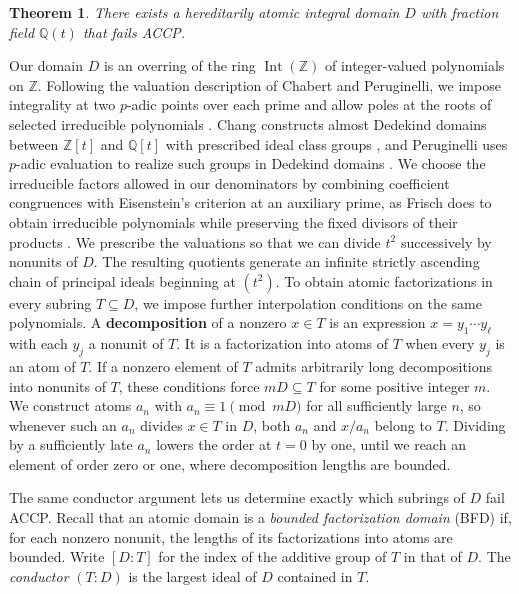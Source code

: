 \documentclass{article}
\newtheorem{theorem}[proposition]{Theorem}
\theoremstyle{remark}
\begin{document}
\begin{theorem}
    \label{thm:counterexample}
    There exists a hereditarily atomic integral domain $D$ with fraction field $\mathbb{Q}(t)$ that fails ACCP.
\end{theorem}

Our domain $D$ is an overring of the ring $\operatorname{Int}(\mathbb{Z})$ of integer-valued polynomials on $\mathbb{Z}$.
Following the valuation description of Chabert and Peruginelli, we impose integrality at two $p$-adic points over each prime and allow poles at the roots of selected irreducible polynomials \cite[\S4]{CPOverrings}.
Chang constructs almost Dedekind domains between $\mathbb{Z}[t]$ and $\mathbb{Q}[t]$ with prescribed ideal class groups \cite[Theorem~3.5]{Chang}, and Peruginelli uses $p$-adic evaluation to realize such groups in Dedekind domains \cite[Theorem~3.1]{Peruginelli}.
We choose the irreducible factors allowed in our denominators by combining coefficient congruences with Eisenstein's criterion at an auxiliary prime, as Frisch does to obtain irreducible polynomials while preserving the fixed divisors of their products \cite[Lemma~6]{Frisch}.
We prescribe the valuations so that we can divide $t^2$ successively by nonunits of $D$.
The resulting quotients generate an infinite strictly ascending chain of principal ideals beginning at $(t^2)$.
To obtain atomic factorizations in every subring $T \subseteq D$, we impose further interpolation conditions on the same polynomials.
A \textbf{decomposition} of a nonzero $x \in T$ is an expression $x = y_1 \cdots y_\ell$ with each $y_j$ a nonunit of $T$.
It is a factorization into atoms of $T$ when every $y_j$ is an atom of $T$.
If a nonzero element of $T$ admits arbitrarily long decompositions into nonunits of $T$, these conditions force $mD \subseteq T$ for some positive integer $m$.
We construct atoms $a_n$ with $a_n \equiv 1 \pmod{mD}$ for all sufficiently large $n$, so whenever such an $a_n$ divides $x \in T$ in $D$, both $a_n$ and $x/a_n$ belong to $T$.
Dividing by a sufficiently late $a_n$ lowers the order at $t = 0$ by one, until we reach an element of order zero or one, where decomposition lengths are bounded.

The same conductor argument lets us determine exactly which subrings of $D$ fail ACCP.
Recall that an atomic domain is a \emph{bounded factorization domain} (BFD) if, for each nonzero nonunit, the lengths of its factorizations into atoms are bounded.
Write $[D : T]$ for the index of the additive group of $T$ in that of $D$.
The \emph{conductor} $(T : D)$ is the largest ideal of $D$ contained in $T$.
\end{document}
